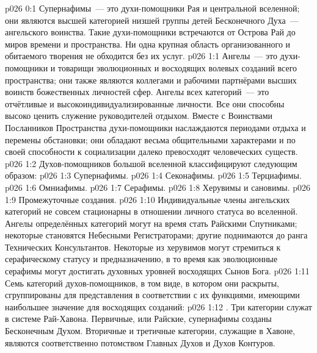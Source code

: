 \author{Совершенствователь Мудрости}
\vs p026 0:1 Супернафимы~--- это духи\hyp{}помощники Рая и центральной вселенной; они являются высшей категорией низшей группы детей Бесконечного Духа~--- ангельского воинства. Такие духи\hyp{}помощники встречаются от Острова Рай до миров времени и пространства. Ни одна крупная область организованного и обитаемого творения не обходится без их услуг.
\vs p026 1:1 Ангелы~--- это духи\hyp{}помощники и товарищи эволюционных и восходящих волевых созданий всего пространства; они также являются коллегами и рабочими партнёрами высших воинств божественных личностей сфер. Ангелы всех категорий~--- это отчётливые и высокоиндивидуализированные личности. Все они способны высоко ценить служение руководителей отдыхом. Вместе с Воинствами Посланников Пространства духи\hyp{}помощники наслаждаются периодами отдыха и перемены обстановки; они обладают весьма общительными характерами и по своей способности к социализации далеко превосходят человеческих существ.
\vs p026 1:2 \pc Духов\hyp{}помощников большой вселенной классифицируют следующим образом:
\vs p026 1:3 Супернафимы.
\vs p026 1:4 Секонафимы.
\vs p026 1:5 Терциафимы.
\vs p026 1:6 Омниафимы.
\vs p026 1:7 Серафимы.
\vs p026 1:8 Херувимы и сановимы.
\vs p026 1:9 Промежуточные создания.
\vs p026 1:10 \pc Индивидуальные члены ангельских категорий не совсем стационарны в отношении личного статуса во вселенной. Ангелы определённых категорий могут на время стать Райскими Спутниками; некоторые становятся Небесными Регистраторами; другие поднимаются до ранга Технических Консультантов. Некоторые из херувимов могут стремиться к серафическому статусу и предназначению, в то время как эволюционные серафимы могут достигать духовных уровней восходящих Сынов Бога.
\vs p026 1:11 \pc Семь категорий духов\hyp{}помощников, в том виде, в котором они раскрыты, сгруппированы для представления в соответствии с их функциями, имеющими наибольшее значение для восходящих созданий:
\vs p026 1:12 . Три категории  служат в системе Рай\hyp{}Хавона. Первичные, или Райские, супернафимы созданы Бесконечным Духом. Вторичные и третичные категории, служащие в Хавоне, являются соответственно потомством Главных Духов и Духов Контуров.
